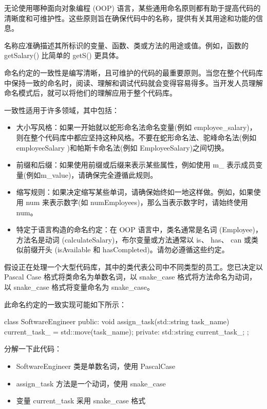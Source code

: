 
无论使用哪种面向对象编程 (OOP) 语言，某些通用命名原则都有助于提高代码的清晰度和可维护性。这些原则旨在确保代码中的名称，提供有关其用途和功能的信息。


名称应准确描述其所标识的变量、函数、类或方法的用途或值。例如，函数的 getSalary() 比简单的 getS() 更具体。


命名约定的一致性是编写清晰，且可维护的代码的最重要原则。当您在整个代码库中保持一致的命名时，阅读、理解和调试代码就会变得容易得多。当开发人员理解命名模式后，就可以将他们的理解应用于整个代码库。

一致性适用于许多领域，其中包括：

\begin{itemize}
\item
大小写风格：如果一开始就以蛇形命名法命名变量(例如 employee\_salary)，则在整个代码库中都应坚持这种风格。不要在蛇形命名法、驼峰命名法(例如 employeeSalary )和帕斯卡命名法(例如 EmployeeSalary)之间切换。

\item
前缀和后缀：如果使用前缀或后缀来表示某些属性，例如使用 m\_ 表示成员变量(例如m\_value)，请确保完全遵循此规则。

\item
缩写规则：如果决定缩写某些单词，请确保始终如一地这样做。例如，如果使用 num 来表示数字(如 numEmployees)，那么当表示数字时，请始终使用 num。

\item
特定于语言构造的命名约定：在 OOP 语言中，类名通常是名词 (Employee)，方法名是动词 (calculateSalary)，布尔变量或方法通常以 is、 has、 can 或类似前缀开头 (isAvailable 和 hasCompleted)。请勿必遵循这些约定。
\end{itemize}

假设正在处理一个大型代码库，其中的类代表公司中不同类型的员工。您已决定以 Pascal Case 格式将类命名为单数名词，以 snake\_case 格式将方法命名为动词，以 snake\_case 格式将变量命名为 snake\_case。

此命名约定的一致实现可能如下所示：

\begin{cpp}
class SoftwareEngineer {
public:
    void assign_task(std::string task_name) {
        current_task_ = std::move(task_name);
    }
private:
    std::string current_task_;
};
\end{cpp}

分解一下此代码：

\begin{itemize}
\item
SoftwareEngineer 类是单数名词，使用 PascalCase

\item
assign\_task 方法是一个动词，使用 snake\_case

\item
变量 current\_task 采用 snake\_case 格式
\end{itemize}

